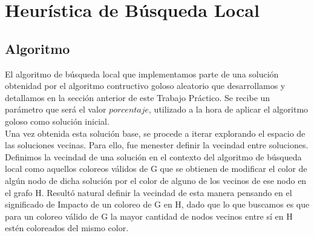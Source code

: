 \section{Heurística de Búsqueda Local}

\subsection{Algoritmo}


\indent El algoritmo de búsqueda local que implementamos parte de una solución obtenidad por el algoritmo contructivo goloso aleatorio que desarrollamos y detallamos en la sección anterior de este Trabajo Práctico. Se recibe un parámetro que será el valor $porcentaje$, utilizado a la hora de aplicar el algoritmo goloso como solución inicial.\\
\indent Una vez obtenida esta solución base, se procede a iterar explorando el espacio de las soluciones vecinas.
Para ello, fue menester definir la vecindad entre soluciones. Definimos la vecindad de una solución en el contexto del algoritmo de búsqueda local como aquellos coloreos válidos de G que se obtienen de modificar el color de algún nodo de dicha solución por el color de alguno de los vecinos de ese nodo en el grafo H. Resultó natural definir la vecindad de esta manera pensando en el significado de Impacto de un coloreo de G en H, dado que lo que buscamos es que para un coloreo válido de G la mayor cantidad de nodos vecinos entre sí en H estén coloreados del mismo color.\\

